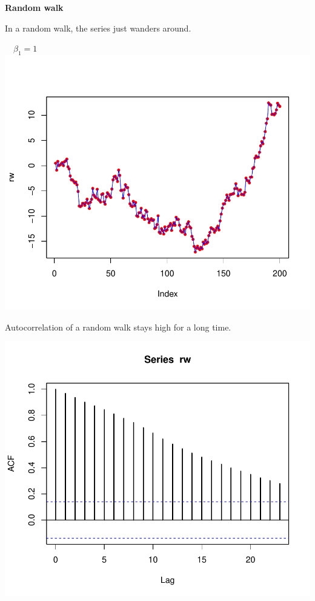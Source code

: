 \documentclass[12pt,xcolor=svgnames]{beamer}
\newcommand{\theme}{\color{FireBrick}}
\newcommand{\sk}{\vspace{.4cm}}
\newcommand{\nochap}{\vspace{0.5cm}}
\newcommand{\chap}[1]{{\theme \Large \bf #1} \sk}
\begin{document}
\begin{frame}
\chap{Random walk}

In a random walk, the series just wanders around.
\begin{center}
\ \ $\beta_1 = 1$\\
\includegraphics[scale=0.55,trim=10 50 0 50]{randwalk_new}
\end{center}

\end{frame}

\begin{frame}
\nochap

Autocorrelation of a random walk stays high for a long time.

\begin{center}
\includegraphics[scale=0.55,trim=20 20 0 10]{acfrandwalk_new}
\end{center}

\end{frame}
\end{document}
